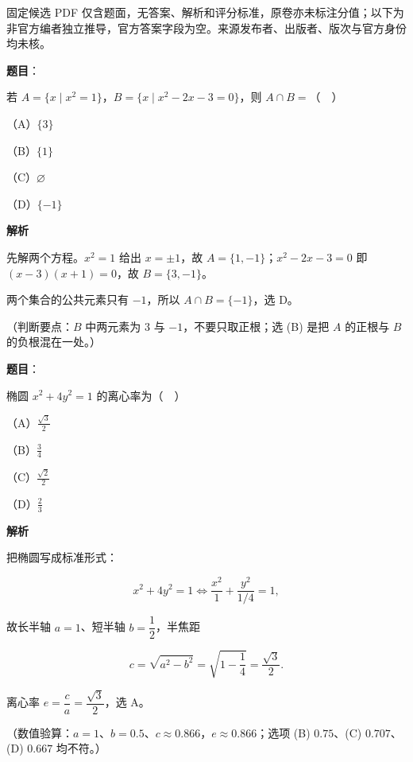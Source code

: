 

\begin{gktip}
固定候选 PDF 仅含题面，无答案、解析和评分标准，原卷亦未标注分值；以下为非官方编者独立推导，官方答案字段为空。来源发布者、出版者、版次与官方身份均未核。
\end{gktip}

\begin{answer}

\textbf{题目}：

若 $A=\{x\mid x^2=1\}$，$B=\{x\mid x^2-2x-3=0\}$，则 $A\cap B=$（　）

（A）$\{3\}$

（B）$\{1\}$

（C）$\varnothing$

（D）$\{-1\}$

\textbf{解析}

先解两个方程。$x^2=1$ 给出 $x=\pm1$，故 $A=\{1,-1\}$；$x^2-2x-3=0$ 即 $(x-3)(x+1)=0$，故 $B=\{3,-1\}$。

两个集合的公共元素只有 $-1$，所以 $A\cap B=\{-1\}$，选 D。

（判断要点：$B$ 中两元素为 $3$ 与 $-1$，不要只取正根；选 (B) 是把 $A$ 的正根与 $B$ 的负根混在一处。）


\end{answer}
\begin{answer}

\textbf{题目}：

椭圆 $x^2+4y^2=1$ 的离心率为（　）

（A）$\frac{\sqrt3}{2}$

（B）$\frac34$

（C）$\frac{\sqrt2}{2}$

（D）$\frac23$

\textbf{解析}

把椭圆写成标准形式：

\nopagebreak[4]
\[x^2+4y^2=1\iff \frac{x^2}{1}+\frac{y^2}{1/4}=1,\]

故长半轴 $a=1$、短半轴 $b=\dfrac12$，半焦距

\nopagebreak[4]
\[c=\sqrt{a^2-b^2}=\sqrt{1-\frac14}=\frac{\sqrt3}{2}.\]

离心率 $e=\dfrac ca=\dfrac{\sqrt3}{2}$，选 A。

（数值验算：$a=1$、$b=0.5$、$c\approx0.866$，$e\approx0.866$；选项 (B) $0.75$、(C) $0.707$、(D) $0.667$ 均不符。）


\end{answer}
